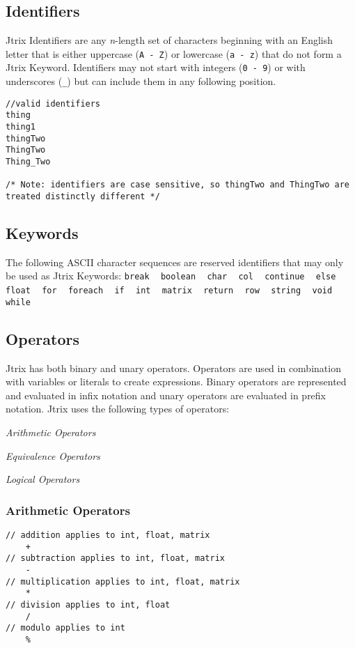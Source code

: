 \documentclass[12pt]{report}
\begin{document}
\subsection{Identifiers}
Jtrix Identifiers are any \textit{n}-length set of characters beginning with an English letter that is either uppercase (\texttt{A - Z}) or lowercase (\texttt{a - z}) that do not form a Jtrix Keyword. Identifiers may not start with integers (\texttt{0 - 9}) or with underscores (\texttt{\_}) but can include them in any following position.
\begin{lstlisting}
//valid identifiers
thing
thing1
thingTwo
ThingTwo
Thing_Two

/* Note: identifiers are case sensitive, so thingTwo and ThingTwo are treated distinctly different */
\end{lstlisting}

\subsection{Keywords}
The following ASCII character sequences are reserved identifiers that may only be used as Jtrix Keywords:
 \color{blue}\texttt{break}	 		
~	 \color{blue}\texttt{boolean} 	
~	 \color{blue}\texttt{char} 
~	 \color{blue}\texttt{col} 
~	 \color{blue}\texttt{continue} 
~	 \color{blue}\texttt{else} 
~	 \color{blue}\texttt{float} 
~		 \color{blue}\texttt{for} 
~	 \color{blue}\texttt{foreach}
~	 \color{blue}\texttt{if} 
~	 \color{blue}\texttt{int} 
~	 \color{blue}\texttt{matrix} 
~	 \color{blue}\texttt{return} 
~	 \color{blue}\texttt{row} 
~	 \color{blue}\texttt{string} 
~	 \color{blue}\texttt{void} 
~	 \color{blue}\texttt{while}


\subsection{Operators}
Jtrix has both binary and unary operators. Operators are used in combination with variables or literals to create expressions. Binary operators are represented and evaluated in infix notation and unary operators are evaluated in prefix notation. Jtrix uses the following types of operators:

 \textit{Arithmetic Operators}

 \textit{Equivalence Operators}

 \textit{Logical Operators}

\subsubsection{Arithmetic Operators}
\begin{lstlisting}
// addition applies to int, float, matrix
	+
// subtraction applies to int, float, matrix
	-
// multiplication applies to int, float, matrix
	*
// division applies to int, float
	/
// modulo applies to int
	%
\end{lstlisting}
\end{document}
